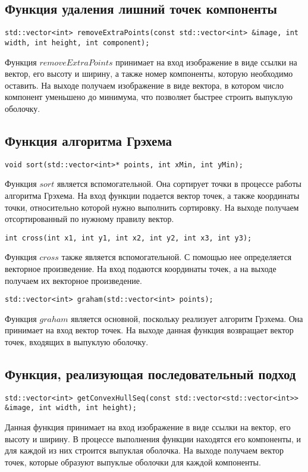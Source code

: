 \subsection{Функция удаления лишний точек компоненты}
\begin{verbatim}
std::vector<int> removeExtraPoints(const std::vector<int> &image, int width, int height, int component);
\end{verbatim}
Функция $removeExtraPoints$ принимает на вход изображение в виде ссылки на вектор, его высоту и ширину, а также номер компоненты, которую необходимо оставить. На выходе получаем изображение в виде вектора, в котором число компонент уменьшено до минимума, что позволяет быстрее строить выпуклую оболочку.

\subsection{Функция алгоритма Грэхема}
\begin{verbatim}
void sort(std::vector<int>* points, int xMin, int yMin);
\end{verbatim}
Функция $sort$ является вспомогательной. Она сортирует точки в процессе работы алгоритма Грэхема. На вход функции подается вектор точек, а также координаты точки, относительно которой нужно выполнить сортировку. На выходе получаем отсортированный по нужному правилу вектор.
\begin{verbatim}
int cross(int x1, int y1, int x2, int y2, int x3, int y3);
\end{verbatim}
Функция $cross$ также является вспомогательной. С помощью нее определяется векторное произведение. На вход подаются координаты точек, а на выходе получаем их векторное произведение.
\begin{verbatim}
std::vector<int> graham(std::vector<int> points);
\end{verbatim}
Функция $graham$ является основной, поскольку реализует алгоритм Грэхема. Она принимает на вход вектор точек. На выходе данная функция возвращает вектор точек, входящих в выпуклую оболочку.

\subsection{Функция, реализующая последовательный подход}
\begin{verbatim}
std::vector<int> getConvexHullSeq(const std::vector<std::vector<int>> &image, int width, int height);
\end{verbatim}
Данная функция принимает на вход изображение в виде ссылки на вектор, его высоту и ширину. В процессе выполнения функции находятся его компоненты, и для каждой из них строится выпуклая оболочка. На выходе получаем вектор точек, которые образуют выпуклые оболочки для каждой компоненты.


